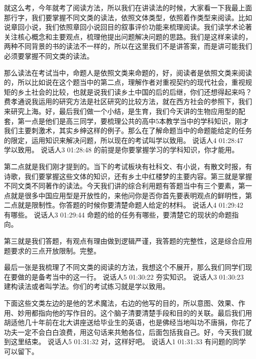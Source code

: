 \documentclass{ctexart}
\renewcommand{\\}{\par}
\begin{document}
就这么考，今年就考了阅读方法，所以我们在讲读法的时候，大家看一下我最上面那行字，我们要掌握不同文类的读法，依照文体类型，依照着作类型来阅读。比如说章回小说，我们依照章回小说回目的叙事评价功能来梳理阅读。我们读学术论著关注核心概念和主要观点，梳理他提出问题解决问题的思路。我们是这样来读的，两种不同背景的书的读法不一样的，所以在这里我们不是讲答案，而是讲可能我们必须要掌握不同文类的读法。

那么读法在考试当中，命题人是依照文类来命题的，好，阅读者是依照文类来阅读的，所以比如说在这个题当中的第二点，理解作者对重视契约的现代社会，重视规矩的乡土社会的比较，也就是说我们读乡土中国的后的后继，你们还想得起来吗？费孝通说我运用的研究方法是社区研究的比较方法，就在西方社会的参照下，我们来研究上海。好，最后我们做一个小结，是生育，我们今天讲的生物应用型的配套，第一点是他们是高三同学，要梳理公共的高中5本教学当中的学科知识，刚才我们主要刺激术，其实乡绅这样的例子。那么在了解命题当中的命题能给定的任务的限定，运用知识来解决问题，所以现在的考试叫学以致用。
说话人4 01:28:47
学以致用。
说话人3 01:28:48
的前提是你要掌握学习的学科知识，你才能用。

第二点就是我们刚才提到的。当下的考试板块有社科文、有小说，有散文时报，有诗歌，我们要掌握这些文体的知识，还有乡土中红楼梦的主要内容。第三就是掌握不同文类不同著作的读法。今天我们讲的综合利用题有答题当中有三个要素，第一点就是很多中国应用型是开放性的，来他问你是否你首先要表明观点的鲜明性，第二点就是限制性。你答题的时候你要清楚命题人给定的材料。
说话人4 01:29:42
有哪些。
说话人3 01:29:44
命题的给的任务有哪些，要清楚它的现状的命题指向。

第三就是我们答题，有观点有理由做到逻辑严谨，我答题的完整性，这是综合应用题要求的三点开放限制。完整。

最后一张是我梳理了不同文类的阅读的方法，我想这个不展开，那么我们同学们现在要做的是备考当中的这一行。
说话人5 01:30:22
夯实知识。
说话人3 01:30:23
建构读法或者叫学法。你们的考试练习就是学以致用。

下面这些文类左边的是他的艺术魔法，右边的他写的目的，所以意图、效果、作用、妙用都指向他的写作目的。这个脑子清要清楚手段和目的的关联。最后我们用胡适他几十年前在北大讲座送给毕业生的英语，也是佛经当地叫功不唐捐，你花了功夫一定不会白白浪费，用这句话来共勉各位，后面包括我自己。好，今天我们就到这里结束。
说话人5 01:31:32
对，这样好吧。
说话人1 01:31:33
有问题的同学可以留下。
\end{document}

